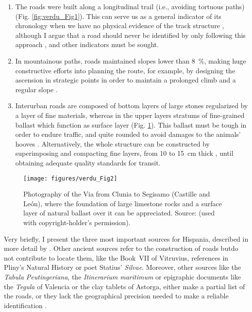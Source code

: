 	\begin{enumerate}
		\item The roads were built along a longitudinal trail (i.e., avoiding tortuous paths) (Fig. \ref{fig:verdu_Fig1}). This can serve us as a general indicator of its chronology when we have no physical evidence of the track structure \parencites[362--363]{Arasa_2008}[415]{Sillières_1990}, although I argue that a road should never be identified by only following this approach \parencite[14]{Abásolo_1990}, and other indicators must be sought.
		\item In mountainous paths, roads maintained slopes lower than \SI{8}{\percent}, making huge constructive efforts into planning the route, for example, by designing the ascension in strategic points in order to maintain a prolonged climb and a regular slope \parencites[15]{Abásolo_1990}[21--22]{Moreno_2009}.
		\item Interurban roads \parencite[417]{Sillières_1990} are composed of bottom layers of large stones regularized by a layer of fine materials, whereas in the upper layers stratums of fine-grained ballast which function as surface layer (Fig. \ref{fig:verdu_Fig2}). This ballast must be tough in order to endure traffic, and quite rounded to avoid damages to the animals’ hooves \parencite[28]{Moreno_2009}. Alternatively, the whole structure can be constructed by superimposing and compacting fine layers, from \num{10} to \SI{15}{\centi\meter} thick \parencite[23]{Moreno_2009}, until obtaining adequate quality standards for transit. 
	\end{enumerate}
	
	\begin{figure}[!htb]
		\texttt{[image: figures/verdu\_Fig2]}
		\caption{Photography of the Via from Clunia to Segisamo (Castille and León), where the foundation of large limestone rocks and a surface layer of natural ballast over it can be appreciated. Source: \textcite[24]{Moreno_2004} (used with copyright-holder’s permission).}
		\label{fig:verdu_Fig2}
	\end{figure}	
Very  briefly, I present the three most important sources for Hispania, described in more detail by \textcite{Roldán_1975}. Other ancient sources refer to the construction of roads butdo not contribute to locate them, like the Book~VII of Vitruvius, references in Pliny’s Natural History or poet Statius’ \textit{Silvae}. Moreover, other sources like the \textit{Tabula Peutingeriana}, the \textit{Itinerarium maritimum} or epigraphic documents like the \textit{Tegula} of Valencia or the clay tablets of Astorga, either make a partial list of the roads, or they lack the geographical precision needed to make a reliable identification \parencites[3]{Arias_1987}[102--175]{Roldán_1975}.
	
